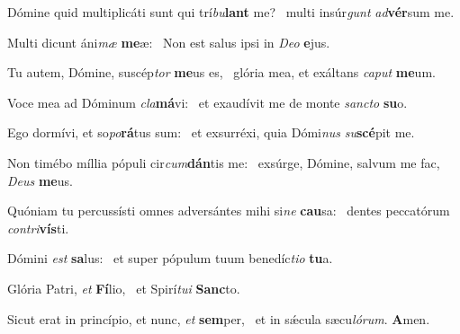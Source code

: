 \item Dómine quid multiplicáti sunt qui trí\textit{bu}\textbf{lant} me?~\psstar{} multi insúr\textit{gunt} \textit{ad}\textbf{vér}sum me.
\item Multi dicunt áni\textit{mæ} \textbf{me}æ:~\psstar{} Non est salus ipsi in \textit{Deo} \textbf{e}jus.
\item Tu autem, Dómine, suscép\textit{tor} \textbf{me}us es,~\psstar{} glória mea, et exáltans \textit{caput} \textbf{me}um.
\item Voce mea ad Dóminum \textit{cla}\textbf{má}vi:~\psstar{} et exaudívit me de monte \textit{sancto} \textbf{su}o.
\item Ego dormívi, et so\textit{po}\textbf{rá}tus sum:~\psstar{} et exsurréxi, quia Dómi\textit{nus} \textit{su}\textbf{scé}pit me.
\item Non timébo míllia pópuli cir\textit{cum}\textbf{dán}tis me:~\psstar{} exsúrge, Dómine, salvum me fac, \textit{Deus} \textbf{me}us.
\item Quóniam tu percussísti omnes adversántes mihi si\textit{ne} \textbf{cau}sa:~\psstar{} dentes peccatórum \textit{contri}\textbf{vís}ti.
\item Dómini \textit{est} \textbf{sa}lus:~\psstar{} et super pópulum tuum benedíc\textit{tio} \textbf{tu}a.
\item Glória Patri, \textit{et} \textbf{Fí}lio,~\psstar{} et Spirí\textit{tui} \textbf{Sanc}to.
\item Sicut erat in princípio, et nunc, \textit{et} \textbf{sem}per,~\psstar{} et in sǽcula sæcu\textit{lórum}. \textbf{A}men.

